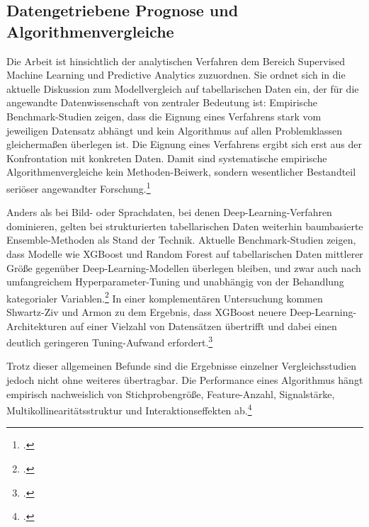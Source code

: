 \documentclass[12pt,a4paper]{article}
\begin{document}

\subsection{Datengetriebene Prognose und Algorithmenvergleiche}


Die Arbeit ist hinsichtlich der analytischen Verfahren dem Bereich Supervised Machine Learning und
Predictive Analytics zuzuordnen. Sie ordnet sich in die aktuelle Diskussion zum Modellvergleich auf
tabellarischen Daten ein, der für die angewandte Datenwissenschaft von zentraler Bedeutung ist:
Empirische Benchmark-Studien zeigen, dass die Eignung eines Verfahrens stark vom jeweiligen
Datensatz abhängt und kein Algorithmus auf allen Problemklassen gleichermaßen überlegen ist. Die
Eignung eines Verfahrens ergibt sich erst aus der Konfrontation mit konkreten Daten. Damit sind
systematische empirische Algorithmenvergleiche kein Methoden-Beiwerk, sondern wesentlicher
Bestandteil seriöser angewandter Forschung.\footcite[3133, 3175]{FernandezDelgado2014}

Anders als bei Bild- oder Sprachdaten, bei denen Deep-Learning-Verfahren dominieren, gelten bei
strukturierten tabellarischen Daten weiterhin baumbasierte Ensemble-Methoden als Stand der Technik.
Aktuelle Benchmark-Studien zeigen, dass Modelle wie XGBoost und Random Forest auf tabellarischen
Daten mittlerer Größe gegenüber Deep-Learning-Modellen überlegen bleiben, und zwar auch nach
umfangreichem Hyperparameter-Tuning und unabhängig von der Behandlung kategorialer
Variablen.\footcite{Grinsztajn2022} In einer komplementären Untersuchung kommen Shwartz-Ziv und
Armon zu dem Ergebnis, dass XGBoost neuere Deep-Learning-Architekturen auf einer Vielzahl von
Datensätzen übertrifft und dabei einen deutlich geringeren Tuning-Aufwand
erfordert.\footcite[84-90]{ShwartzZiv2022}

Trotz dieser allgemeinen Befunde sind die Ergebnisse einzelner Vergleichsstudien jedoch nicht ohne
weiteres übertragbar. Die Performance eines Algorithmus hängt empirisch nachweislich von
Stichprobengröße, Feature-Anzahl, Signalstärke, Multikollinearitätsstruktur und Interaktionseffekten
ab.\footcite{Grinsztajn2022}
\end{document}
